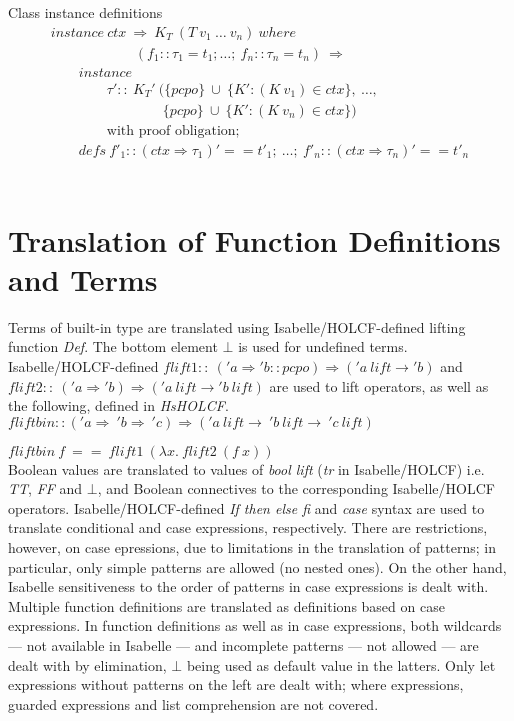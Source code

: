 \documentclass{llncs}
\begin{document}
\noindent Class instance definitions
$$\begin{array}{l}
instance \ ctx \ \Rightarrow \ K_T \ (T \ v_1 \ \ldots \ v_n) \ where \\ 
  \qquad \qquad \qquad (f_1::\tau_1 = t_1; \ldots; \ f_n::\tau_n = t_n)
  \ \Longrightarrow \\
  \qquad instance \\
  \qquad \qquad \tau' :: \ K_{T}' \ (\{pcpo\} \ \cup \ \{K':(K \ v_1)
  \in ctx\}, \ \ldots, \\
  \qquad \qquad \qquad \quad \quad 
         \{pcpo\} \ \cup \ \{K':(K \ v_n) \in ctx\}) \\
  \qquad \qquad \mbox{with \ proof \ obligation}; \\
  \qquad defs \ f'_1 :: (ctx \Rightarrow \tau_1)' == t'_1; \ \ldots; \ f'_n ::
  (ctx \Rightarrow \tau_n)' == t'_n
\end{array}$$\\





\section{Translation of Function Definitions and Terms}

Terms of built-in type are translated using Isabelle/HOLCF-defined lifting function
\emph{Def}.  The bottom element $\bot$ is used for undefined terms.
Isabelle/HOLCF-defined $flift1 :: \ ('a \Rightarrow 'b::pcpo) \Rightarrow ('a \ lift
\to 'b)$ and $flift2 :: \ ('a \Rightarrow 'b) \Rightarrow ('a \ lift \to 'b \ 
lift)$ are used to lift operators, as well as the following, defined in
\emph{HsHOLCF}.\\

$fliftbin :: ('a \Rightarrow \ 'b \Rightarrow \ 'c) 
  \Rightarrow ('a \ lift \to \ 'b \ lift \to \ 'c \ lift) $
 
$fliftbin \ f \ == \ flift1 \ (\lambda x. \ flift2 \ (f \ x))$\\

\noindent Boolean values are translated to values of \emph{bool lift} 
(\emph{tr} in Isabelle/HOLCF) i.e.  \emph{TT}, \emph{FF} and $\bot$, and Boolean
connectives to the corresponding Isabelle/HOLCF operators. Isabelle/HOLCF-defined \emph{If then
  else fi} and \emph{case} syntax are used to translate conditional and case
expressions, respectively.  There are restrictions, however, on case
epressions, due to limitations in the translation of patterns; in particular,
only simple patterns are allowed (no
nested ones). On the other hand, Isabelle sensitiveness to the order of
patterns in case expressions is dealt with. Multiple function definitions are
translated as definitions based on case expressions. In function definitions
as well as in case expressions, both wildcards --- not available in Isabelle
--- and incomplete patterns --- not allowed --- are dealt with by elimination,
$\bot$ being used as default value in the latters. Only let expressions
without patterns on the left are dealt with; where expressions, guarded
expressions and list comprehension are not covered.
\end{document}
